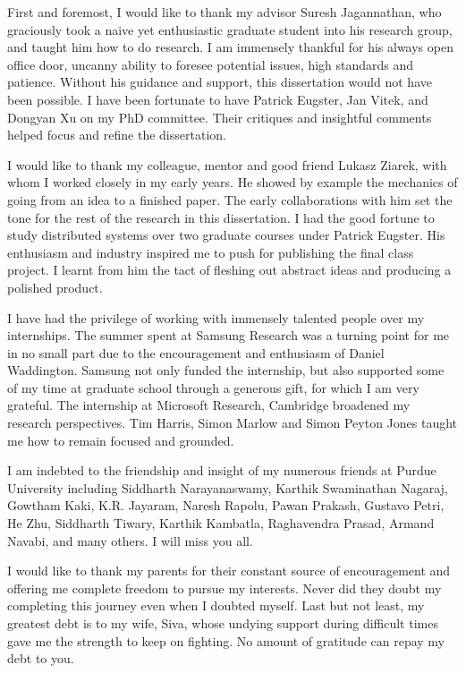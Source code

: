 \begin{acknowledgments}

First and foremost, I would like to thank my advisor Suresh Jagannathan, who
graciously took a naive yet enthusiastic graduate student into his research
group, and taught him how to do research. I am immensely thankful for his
always open office door, uncanny ability to foresee potential issues, high
standards and patience. Without his guidance and support, this dissertation
would not have been possible. I have been fortunate to have Patrick Eugster,
Jan Vitek, and Dongyan Xu on my PhD committee. Their critiques and insightful
comments helped focus and refine the dissertation.

I would like to thank my colleague, mentor and good friend Lukasz Ziarek, with
whom I worked closely in my early years. He showed by example the mechanics of
going from an idea to a finished paper. The early collaborations with him set
the tone for the rest of the research in this dissertation. I had the good
fortune to study distributed systems over two graduate courses under Patrick
Eugster. His enthusiasm and industry inspired me to push for publishing the
final class project. I learnt from him the tact of fleshing out abstract ideas
and producing a polished product.

I have had the privilege of working with immensely talented people over my
internships. The summer spent at Samsung Research was a turning point for me in
no small part due to the encouragement and enthusiasm of Daniel Waddington.
Samsung not only funded the internship, but also supported some of my time at
graduate school through a generous gift, for which I am very grateful. The
internship at Microsoft Research, Cambridge broadened my research perspectives.
Tim Harris, Simon Marlow and Simon Peyton Jones taught me how to remain focused
and grounded.

I am indebted to the friendship and insight of my numerous friends at Purdue
University including Siddharth Narayanaswamy, Karthik Swaminathan Nagaraj,
Gowtham Kaki, K.R. Jayaram, Naresh Rapolu, Pawan Prakash, Gustavo Petri, He
Zhu, Siddharth Tiwary, Karthik Kambatla, Raghavendra Prasad, Armand Navabi, and
many others. I will miss you all.

I would like to thank my parents for their constant source of encouragement and
offering me complete freedom to pursue my interests. Never did they doubt my
completing this journey even when I doubted myself. Last but not least, my
greatest debt is to my wife, Siva, whose undying support during difficult times
gave me the strength to keep on fighting. No amount of gratitude can repay my
debt to you.
\end{acknowledgments}

